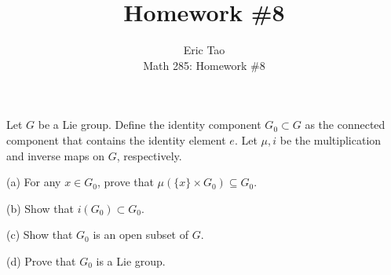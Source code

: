 \documentclass[10pt]{article}
\newenvironment{problem}[2][]{\begin{trivlist}
\item[\hskip \labelsep {\bfseries #1}\hskip \labelsep {\bfseries #2.}]}{\end{trivlist}}
\begin{document}
 
\title{Homework \#8}
\author{Eric Tao\\
Math 285: Homework \#8}
\maketitle

\begin{problem}{Question 1}

Let $G$ be a Lie group. Define the identity component $G_0 \subset G$ as the connected component that contains the identity element $e$. Let $\mu, i$ be the multiplication and inverse maps on $G$, respectively.

(a) For any $x \in G_0$, prove that $\mu(\{ x \} \times G_0 ) \subseteq G_0 $.

(b) Show that $i(G_0) \subset G_0$. 

(c) Show that $G_0$ is an open subset of $G$.

(d) Prove that $G_0$ is a Lie group.


\end{problem}
\end{document}

